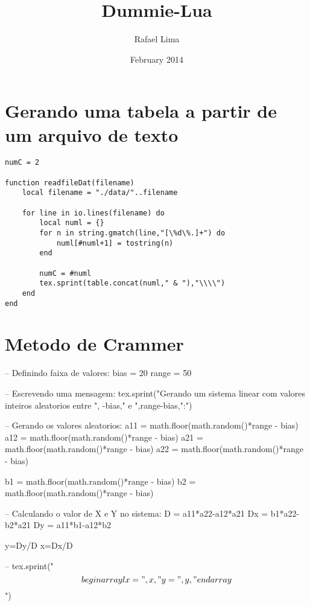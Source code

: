 \documentclass{article}
\title{Dummie-Lua}
\author{Rafael Lima}
\date{February 2014}
\begin{document}

\maketitle

\section{Gerando uma tabela a partir de um arquivo de texto}
\begin{verbatim}
numC = 2
 
function readfileDat(filename)
    local filename = "./data/"..filename
 
    for line in io.lines(filename) do
        local numl = {}
        for n in string.gmatch(line,"[\%d\%.]+") do
            numl[#numl+1] = tostring(n)
        end

        numC = #numl
        tex.sprint(table.concat(numl," & "),"\\\\")
    end
end
\end{verbatim}



\section{Metodo de Crammer}

\newcommand{\printLua}[1]{\directlua{tex.print(#1)}}

\begin{luacode}
-- Definindo faixa de valores:
bias = 20
range = 50 

-- Escrevendo uma mensagem:
tex.sprint("Gerando um sistema linear com valores inteiros aleatorios entre ",
   -bias," e ",range-bias,":")

-- Gerando os valores aleatorios:
a11 = math.floor(math.random()*range - bias)
a12 = math.floor(math.random()*range - bias)
a21 = math.floor(math.random()*range - bias)
a22 = math.floor(math.random()*range - bias)

b1 = math.floor(math.random()*range - bias)
b2 = math.floor(math.random()*range - bias)

-- Calculando o valor de X e Y no sistema:
D = a11*a22-a12*a21
Dx = b1*a22-b2*a21
Dy = a11*b1-a12*b2

y=Dy/D
x=Dx/D

-- tex.sprint("$$\\begin{array}{l}x = ",x,"\\\\y = ",y,"\\end{array}$$")
\end{luacode}
\end{document}
